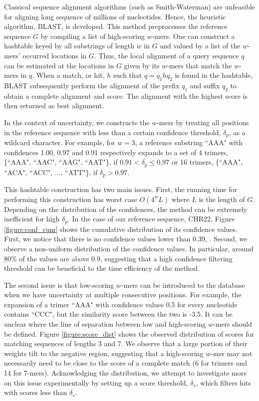 \documentclass{article}
\begin{document}
Classical sequence alignment algorithms (such as Smith-Waterman) are unfeasible for aligning long sequence of millions of nucleotides. Hence, the heuristic algorithm, BLAST, is developed. \cite{blast} This method preprocesses the reference sequence $G$ by compiling a list of high-scoring $w$-mers. One can construct a hashtable keyed by all substrings of length $w$ in $G$ and valued by a list of the $w$-mers' occurred locations in $G$. Thus, the local alignment of a query sequence $q$ can be estimated at the locations in $G$ given by its $w$-mers that match the $w$-mers in $q$. When a match, or hit, $h$ such that $q = q_1hq_2$ is found in the hashtable, BLAST subsequently perform the alignment of the prefix $q_1$ and suffix $q_2$ to obtain a complete alignment and score. The alignment with the highest score is then returned as best alignment.

In the context of uncertainty, we constructs the $w$-mers by treating all positions in the reference sequence with less than a certain confidence threshold, $\delta_p$, as a wildcard character. For example, for $w = 3$, a reference substring ``AAA" with confidences 1.00, 0.97 and 0.91 respectively expands to a set of 4 trimers, \{``AAA", ``AAC", ``AAG", ``AAT"\}, if $0.91 < \delta_p \leq 0.97$ or 16 trimers, \{``AAA", ``ACA", ``ACC", ..., ``ATT"\}, if $\delta_p > 0.97$. 

This hashtable construction has two main issues. First, the running time for performing this construction has worst case $O(4^wL)$ where $L$ is the length of $G$. Depending on the distribution of the confidences, the method can be extremely inefficient for high $\delta_p$. In the case of our reference sequence, CHR22, Figure \ref{figure:conf_cum} shows the cumulative distribution of its confidence values. First, we notice that there is no confidence values lower than 0.39, . Second, we observe a non-uniform distribution of the confidence values. In particular, around 80\% of the values are above 0.9, suggesting that a high confidence filtering threshold can be beneficial to the time efficiency of the method. 

The second issue is that low-scoring $w$-mers can be introduced to the database when we have uncertainty at multiple consecutive positions. For example, the expansion of a trimer ``AAA" with confidence values 0.5 for every nucleotide contains ``CCC", but the similarity score between the two is -3.5. It can be unclear where the line of separation between low and high-scoring $w$-mers should be defined. Figure \ref{figure:score_dist} shows the observed distribution of scores for matching sequences of lengths 3 and 7. We observe that a large portion of their weights tilt to the negative region, suggesting that a high-scoring $w$-mer may not necessarily need to be close to the score of a complete match (6 for trimers and 14 for 7-mers). Acknowledging the distribution, we attempt to investigate more on this issue experimentally by setting up a score threshold, $\delta_s$, which filters hits with scores less than $\delta_s$.
\end{document}
